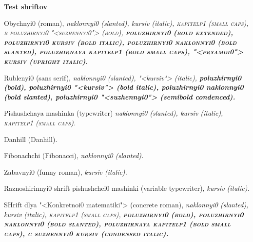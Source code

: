 \documentclass[russian,english%
]{book}
\begin{document}
\pagestyle{plain}
\obeylines
\centerline{\Large\bfseries{}Test shriftov}


\bigskip
\rmfamily
\mdseries\upshape
{Obychnyi0} (roman),
\slshape
{naklonnyi0} (slanted),
\itshape
{kursiv} (italic),
\scshape
{kapitelp1} (small caps),
\fontseries b\upshape
{poluzhirnyi0 "<suzhennyi0">} (bold),
\bfseries\upshape
{poluzhirnyi0} (bold extended),
\itshape
{poluzhirnyi0 kursiv} (bold italic),
\slshape
{poluzhirnyi0 naklonnyi0} (bold slanted),
\scshape
{poluzhirnaya kapitelp1} (bold small caps),
\mdseries{}\selectfont
{"<pryamoi0"> kursiv} (upright italic).

\bigskip
\sffamily
\mdseries\upshape
{Rublenyi0} (sans serif),
\slshape
{naklonnyi0} (slanted),
\itshape
{"<kursiv">} (italic),
\bfseries\upshape
{poluzhirnyi0} (bold),
\itshape
{poluzhirnyi0 "<kursiv">} (bold italic),
\slshape
{poluzhirnyi0 naklonnyi0} (bold slanted),
\upshape
{poluzhirnyi0 "<suzhennyi0">} (semibold condenced).

\bigskip
\ttfamily
\mdseries\upshape
{Pishushchaya mashinka} (typewriter)
\slshape
{naklonnyi0} (slanted),
\itshape
{kursiv} (italic),
\scshape
{kapitelp1} (small caps).

\bigskip
{}%
\mdseries\upshape
{Danhill} (Danhill).

\bigskip
{}%
\mdseries\upshape
{Fibonachchi} (Fibonacci),
\slshape
{naklonnyi0} (slanted).

\bigskip
{}%
\mdseries\upshape
{Zabavnyi0} (funny roman),
\itshape
{kursiv} (italic).

\bigskip
{}%
\mdseries\upshape
{Raznoshirinnyi0 shrift pishushchei0 mashinki} (variable typewriter),
\itshape
{kursiv} (italic).

\bigskip
{}%
\mdseries\upshape
{SHrift dlya "<Konkretnoi0 matematiki"> } (concrete roman),
\slshape
{naklonnyi0} (slanted),
\itshape
{kursiv} (italic),
\scshape
{kapitelp1} (small caps),
\bfseries\upshape
{poluzhirnyi0} (bold),
\slshape
{poluzhirnyi0 naklonnyi0} (bold slanted),
\scshape
{poluzhirnaya kapitelp1} (bold small caps),
\fontseries c\slshape
{suzhennyi0 kursiv} (condensed italic).
\end{document}
